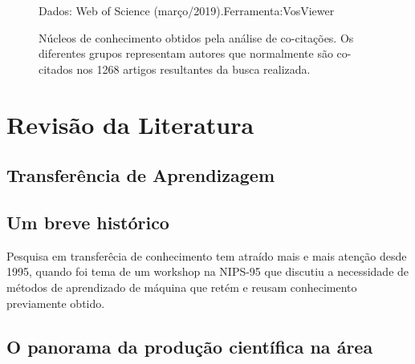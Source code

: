 \documentclass[sigconf]{acmart}
\newcommand{\source}[2]{\raggedleft{}\vspace*{-7mm}\caption*{ \textmd{\scriptsize{Dados: {#1}.\hfill Ferramenta:{#2}}}}}
\begin{document}
\begin{figure}[h]
  \source{Web of Science (março/2019)}{VosViewer\protect{~\cite{VOSviewer}}}
  \caption{Núcleos de conhecimento obtidos pela análise de co-citações. Os diferentes grupos representam autores que normalmente são co-citados nos 1268 artigos resultantes da busca realizada.}
  \label{fig:classicos}
\end{figure}

\section{Revisão da Literatura}
  \subsection{Transferência de Aprendizagem}
  \lipsum[3]
  \subsection{Um breve histórico}
  Pesquisa em transferêcia de conhecimento tem atraído mais e mais atenção desde 1995, quando foi tema de  um workshop na NIPS-95 que discutiu a necessidade de métodos de aprendizado de máquina que retém e reusam conhecimento previamente obtido\cite{sinno}. 
  \lipsum[2]
  \subsection{O panorama da produção científica na área}\label{sec:panorama}
  \lipsum[1]
  
  
\end{document}
